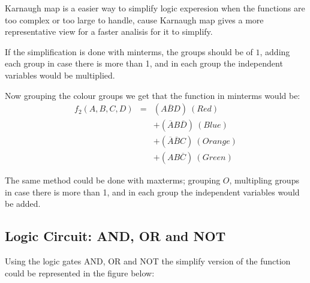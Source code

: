     Karnaugh map is a easier way to simplify logic experesion when the functions are too complex or too large to handle, cause Karnaugh map gives a more representative view for a faster analisis for it to simplify.

    If the simplification is done with minterms, the groups should be of $1$, adding each group in case there is more than 1, and in each group the independent variables would be multiplied.
    \begin{center}
        \begin{Karnaugh}
        \end{Karnaugh}
    \end{center}

    Now grouping the colour groups we get that the function in minterms would be:
    \begin{eqnarray*}
        f_2(A,B,C,D)&=&(A\overline{B}D)~(Red)\\
        &&+(\overline{A}B\overline{D})~(Blue)\\
        &&+(\overline{A}\overline{B}C)~(Orange)\\
        &&+(AB\overline{C})~(Green)
    \end{eqnarray*}

    The same method could be done with maxterms; grouping $O$, multipling groups in case there is more than 1, and in each group the independent variables would be added.

    \subsection{\color{purple}Logic Circuit: AND, OR and NOT}

    Using the logic gates AND, OR and NOT the simplify version of the function could be represented in the figure below:

